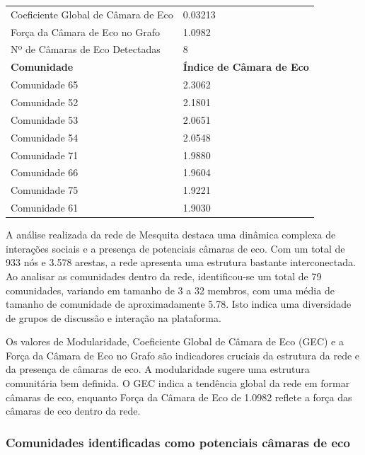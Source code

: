 \begin{table}[ht]
\begin{tabular}{l|l}
		\midrule
		Coeficiente Global de Câmara de Eco & 0.03213                          \\
		Força da Câmara de Eco no Grafo     & 1.0982                           \\
		Nº de Câmaras de Eco Detectadas     & 8                                \\
		\midrule
		\textbf{Comunidade}                 & \textbf{Índice de Câmara de Eco} \\
		\midrule
		Comunidade 65                       & 2.3062                           \\
		Comunidade 52                       & 2.1801                           \\
		Comunidade 53                       & 2.0651                           \\
		Comunidade 54                       & 2.0548                           \\
		Comunidade 71                       & 1.9880                           \\
		Comunidade 66                       & 1.9604                           \\
		Comunidade 75                       & 1.9221                           \\
		Comunidade 61                       & 1.9030                           \\
		\bottomrule
	\end{tabular}
\end{table}

A análise realizada da rede de Mesquita destaca uma dinâmica complexa de interações sociais e a presença de potenciais câmaras de eco. Com um total de 933 nós e 3.578 arestas, a rede apresenta uma estrutura bastante interconectada. Ao analisar as comunidades dentro da rede, identificou-se um total de 79 comunidades, variando em tamanho de 3 a 32 membros, com uma média de tamanho de comunidade de aproximadamente 5.78. Isto indica uma diversidade de grupos de discussão e interação na plataforma.

Os valores de Modularidade, Coeficiente Global de Câmara de Eco (GEC) e a Força da Câmara de Eco no Grafo são indicadores cruciais da estrutura da rede e da presença de câmaras de eco. A modularidade sugere uma estrutura comunitária bem definida. O GEC indica a tendência global da rede em formar câmaras de eco, enquanto Força da Câmara de Eco de 1.0982 reflete a força das câmaras de eco dentro da rede.

\subsubsection*{Comunidades identificadas como potenciais câmaras de eco}

